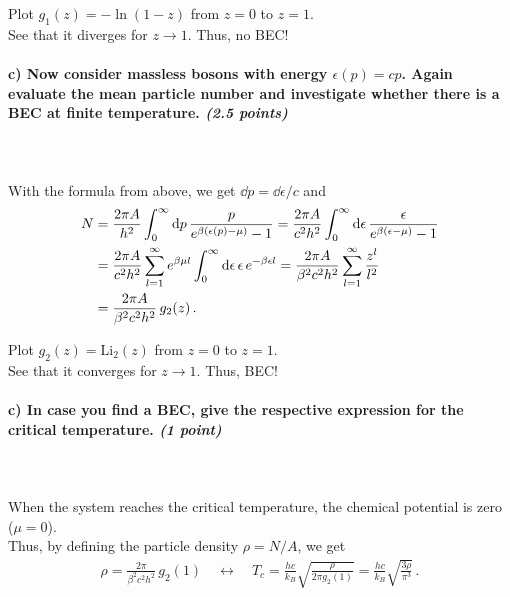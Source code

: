 Plot $g_1(z) = - \ln(1-z)$ from $z=0$ to $z=1$. \\

See that it diverges for $z \longrightarrow 1$. Thus, no BEC!

\paragraph{c) Now consider massless bosons with energy $\epsilon(p)=cp$.
	Again evaluate the mean particle number and investigate whether there is a 
	BEC at finite temperature.
    \textit{(2.5 points)}
} \ \\
\\
With the formula from above, we get $\dd p = \dd\epsilon / c$ and
\begin{align}
	N &= \frac{2\pi A}{h^2} \int_0^{\infty} \mathrm{d} p \, \frac{p}{e^{\beta (\epsilon(p) - \mu)}-1}
	= \frac{2\pi A}{c^2 h^2} \int_0^{\infty} \mathrm{d}\epsilon \, \frac{\epsilon}{e^{\beta (\epsilon - \mu)}-1} \notag \\
	&= \frac{2\pi A}{c^2 h^2} \sum_{l=1}^{\infty} e^{\beta\mu l} \int_0^{\infty} \mathrm{d}\epsilon \, \epsilon \, e^{- \beta\epsilon l}
	= \frac{2\pi A}{\beta^2 c^2 h^2} \sum_{l=1}^{\infty} \frac{z^l}{l^2} \notag \\
	&= \frac{2\pi A}{\beta^2 c^2 h^2} \, g_2(z) \,.
\end{align}

Plot $g_2(z) = \text{Li}_2(z)$ from $z=0$ to $z=1$. \\

See that it converges for $z \longrightarrow 1$. Thus, BEC!

\paragraph{c) In case you find a BEC, give the respective expression for the critical temperature.
    \textit{(1 point)}
} \ \\
\\
When the system reaches the critical temperature, the chemical potential is zero ($\mu=0$). \\
Thus, by defining the particle density $\rho = N/A$, we get
\begin{align}
	\rho = \frac{2\pi}{\beta^2 c^2 h^2} \, g_2(1) \quad \longleftrightarrow \quad
	T_c = \frac{hc}{k_B} \sqrt{\frac{\rho}{2\pi g_2(1)}} = \frac{hc}{k_B} \sqrt{\frac{3\rho}{\pi^3}} \,.
\end{align}